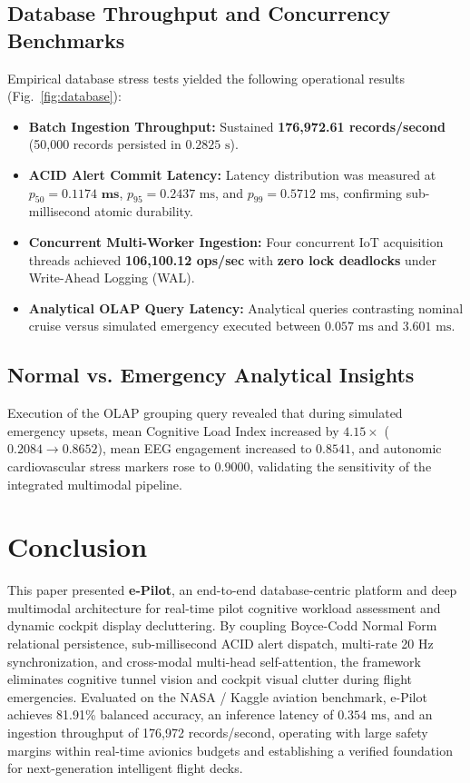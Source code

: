 \documentclass[journal]{IEEEtran}
\begin{document}
\subsection{Database Throughput and Concurrency Benchmarks}
Empirical database stress tests yielded the following operational results (Fig.~\ref{fig:database}):
\begin{itemize}
    \item \textbf{Batch Ingestion Throughput:} Sustained \textbf{176,972.61 records/second} (50,000 records persisted in $0.2825\text{ s}$).
    \item \textbf{ACID Alert Commit Latency:} Latency distribution was measured at $p_{50} = \mathbf{0.1174\text{ ms}}$, $p_{95} = 0.2437\text{ ms}$, and $p_{99} = 0.5712\text{ ms}$, confirming sub-millisecond atomic durability.
    \item \textbf{Concurrent Multi-Worker Ingestion:} Four concurrent IoT acquisition threads achieved \textbf{106,100.12 ops/sec} with \textbf{zero lock deadlocks} under Write-Ahead Logging (WAL).
    \item \textbf{Analytical OLAP Query Latency:} Analytical queries contrasting nominal cruise versus simulated emergency executed between $0.057\text{ ms}$ and $3.601\text{ ms}$.
\end{itemize}

\subsection{Normal vs. Emergency Analytical Insights}
Execution of the OLAP grouping query revealed that during simulated emergency upsets, mean Cognitive Load Index increased by $4.15\times$ ($0.2084 \to 0.8652$), mean EEG engagement increased to $0.8541$, and autonomic cardiovascular stress markers rose to $0.9000$, validating the sensitivity of the integrated multimodal pipeline.

\section{Conclusion}
This paper presented \textbf{e-Pilot}, an end-to-end database-centric platform and deep multimodal architecture for real-time pilot cognitive workload assessment and dynamic cockpit display decluttering. By coupling Boyce-Codd Normal Form relational persistence, sub-millisecond ACID alert dispatch, multi-rate 20 Hz synchronization, and cross-modal multi-head self-attention, the framework eliminates cognitive tunnel vision and cockpit visual clutter during flight emergencies. Evaluated on the NASA / Kaggle aviation benchmark, e-Pilot achieves 81.91\% balanced accuracy, an inference latency of $0.354\text{ ms}$, and an ingestion throughput of 176,972 records/second, operating with large safety margins within real-time avionics budgets and establishing a verified foundation for next-generation intelligent flight decks.



\end{document}
